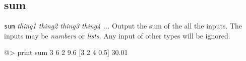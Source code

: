 \subsection*{sum}  
 
{\tt sum} {\it thing1 thing2 thing3 thing4 ...} 
\newline\newline 
Output the sum of the all the inputs.  The inputs may be {\it numbers} or {\it lists}. Any input of other types 
will be ignored. 
\begin{verbatimtab} 
@> print sum 3 6 2 9.6 [3 2 4 0.5] 
30.01 
\end{verbatimtab}
